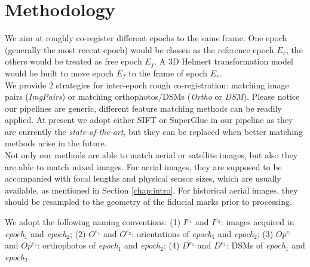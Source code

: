 \section{Methodology}
We aim at roughly co-register different epochs to the same frame. One epoch (generally the most recent epoch) would be chosen as the reference epoch $E_r$, the others would be treated as free epoch $E_f$. A 3D Helmert transformation model would be built to move epoch $E_f$ to the frame of epoch $E_r$.\\
We provide 2 strategies for inter-epoch rough co-registration: matching image pairs (\textit{ImgPairs}) or matching orthophotos/DSMs (\textit{Ortho} or \textit{DSM}). 
Please notice our pipelines are generic, different feature matching methods can be readily applied. At present we adopt either SIFT or SuperGlue in our pipeline as they are currently the \textit{state-of-the-art}, but they can be replaced when better matching methods arise in the future.\\
Not only our methods are able to match aerial or satellite images, but also they are able to match mixed images. For aerial images, they are supposed to be accompanied with focal lengths and physical sensor sizes, which are usually available, as mentioned in Section \ref{chap:intro}. For historical aerial images, they should be resampled to the geometry of the fiducial marks prior to processing. 
\par
We adopt the following naming conventions: (1) $I^{e_1}$ and $I^{e_2}$: images acquired in \textit{epoch$_1$} and \textit{epoch$_2$}; (2) $O^{e_1}$ and $O^{e_2}$: orientations of \textit{epoch$_1$} and \textit{epoch$_2$}; (3) $Op^{e_1}$ and $Op^{e_2}$: orthophotos of \textit{epoch$_1$} and \textit{epoch$_2$}; (4) $D^{e_1}$ and $D^{e_2}$: \ac{DSM}s of \textit{epoch$_1$} and \textit{epoch$_2$}.\\
